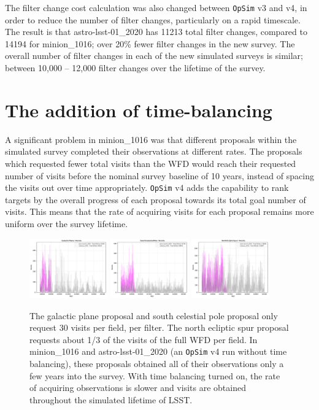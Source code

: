 \documentclass[DM,lsstdraft,authoryear,toc]{lsstdoc}
\newcommand{\opsim}{\texttt{OpSim}\xspace}
\begin{document}
The filter change cost calculation was also changed between \opsim v3 and v4, in order to reduce the number of filter changes, particularly on a rapid timescale. The result is that astro-lsst-01\_2020 has 11213 total filter changes, compared to 14194 for minion\_1016; over 20\% fewer filter changes in the new survey. The overall number of filter changes in each of the new simulated surveys is similar; between 10,000 -- 12,000 filter changes over the lifetime of the survey.

\section{The addition of time-balancing}

A significant problem in minion\_1016 was that different proposals within the simulated survey completed their observations at different rates. The proposals which requested fewer total visits than the WFD would reach their requested number of visits before the nominal survey baseline of 10 years, instead of spacing the visits out over time appropriately. \opsim v4 adds the capability to rank targets by the overall progress of each proposal towards its total goal number of visits. This means that the rate of acquiring visits for each proposal remains more uniform over the survey lifetime.

\begin{figure}[ht]
\centering
\includegraphics[width=0.3\textwidth]{figures/timebalancing_gp}
\includegraphics[width=0.3\textwidth]{figures/timebalancing_scp}
\includegraphics[width=0.3\textwidth]{figures/timebalancing_nes}
\caption{The galactic plane proposal and south celestial pole proposal only request 30 visits per field, per filter. The north ecliptic spur proposal requests about 1/3 of the visits of the full WFD per field. In minion\_1016 and astro-lsst-01\_2020 (an \opsim v4 run without time balancing), these proposals obtained all of their observations only a few years into the survey. With time balancing turned on, the rate of acquiring observations is slower and visits are obtained throughout the simulated lifetime of LSST.
\label{fig:timebalancing}}
\end{figure}
\end{document}
